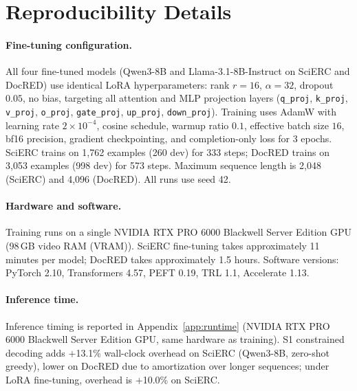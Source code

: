 \section{Reproducibility Details}
\label{app:reproducibility}

\paragraph{Fine-tuning configuration.}
All four fine-tuned models (Qwen3-8B and Llama-3.1-8B-Instruct on SciERC and DocRED) use identical LoRA hyperparameters: rank $r{=}16$, $\alpha{=}32$, dropout $0.05$, no bias, targeting all attention and MLP projection layers (\texttt{q\_proj}, \texttt{k\_proj}, \texttt{v\_proj}, \texttt{o\_proj}, \texttt{gate\_proj}, \texttt{up\_proj}, \texttt{down\_proj}).
Training uses AdamW with learning rate $2{\times}10^{-4}$, cosine schedule, warmup ratio $0.1$, effective batch size $16$, bf16 precision, gradient checkpointing, and completion-only loss for 3 epochs.
SciERC trains on 1,762 examples (260 dev) for 333 steps; DocRED trains on 3,053 examples (998 dev) for 573 steps.
Maximum sequence length is 2,048 (SciERC) and 4,096 (DocRED).
All runs use seed 42.

\paragraph{Hardware and software.}
Training runs on a single NVIDIA RTX PRO 6000 Blackwell Server Edition GPU (98\,GB video RAM (VRAM)).
SciERC fine-tuning takes approximately 11 minutes per model; DocRED takes approximately 1.5 hours.
Software versions: PyTorch 2.10, Transformers 4.57, PEFT 0.19, TRL 1.1, Accelerate 1.13.

\paragraph{Inference time.}
Inference timing is reported in Appendix~\ref{app:runtime} (NVIDIA RTX PRO 6000 Blackwell Server Edition GPU, same hardware as training).
S1 constrained decoding adds $+$13.1\% wall-clock overhead on SciERC (Qwen3-8B, zero-shot greedy), lower on DocRED due to amortization over longer sequences; under LoRA fine-tuning, overhead is $+$10.0\% on SciERC.

